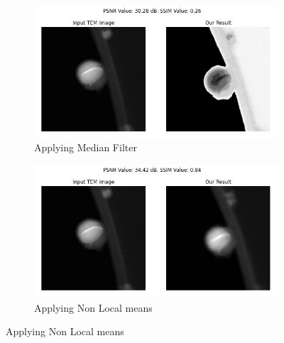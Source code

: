 \begin{figure}[H]
    \vspace{15pt} %
    
    \begin{subfigure}{.47\textwidth} %
        \includegraphics[width=\textwidth]{img/Results/STEM dataset 1/STEM_Data_1_median_filter.jpg}
        \caption{Applying Median Filter}
        \label{fig:Image3}
    \end{subfigure}
    \hfill
    \begin{subfigure}{.47\textwidth} %
        \includegraphics[width=\textwidth]{img/Results/STEM dataset 1/STEM_Data_1_non_local_means.jpg}
        \caption{Applying Non Local means}
        \label{fig:STEM_Dataset_1_Results_Image4}
    \end{subfigure}
    
    \vspace{15pt} %
    

\end{figure}
